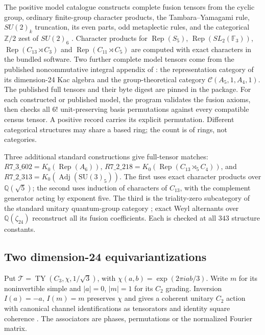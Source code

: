 \documentclass[11pt]{article}
\newcommand{\Z}{\mathbb Z}
\begin{document}
The positive model catalogue constructs complete fusion tensors from
the cyclic group, ordinary finite-group character products, the
Tambara--Yamagami rule, $SU(2)_k$ truncation, its even parts, odd
metaplectic rules, and the categorical $\Z/2$ zest of $SU(2)_6$
\cite{TY,KO,Metaplectic,Zest,Vercleyen}. Character products for
$\operatorname{Rep}(S_5)$, $\operatorname{Rep}(SL_2(\mathbb F_3))$,
$\operatorname{Rep}(C_{13}\rtimes C_3)$ and
$\operatorname{Rep}(C_{11}\rtimes C_5)$ are computed with exact
characters in the bundled software. Two further complete model tensors
come from the published noncommutative integral appendix of
\cite[Theorem~1.6 and Section~6.2]{Integral}: the representation
category of its dimension-24 Kac algebra and the group-theoretical
category $\mathcal C(A_5,1,A_4,1)$. The published full tensors and
their byte digest are pinned in the package. For each constructed or
published model, the program validates the fusion axioms, then checks
all $6!$ unit-preserving basis permutations against every compatible
census tensor. A positive record carries its explicit permutation.
Different categorical structures may share a based ring; the count
is of rings, not categories.

Three additional standard constructions give full-tensor matches:
$R7\_3\_602=K_0(\operatorname{Rep}(A_6))$,
$R7\_2\_218=K_0(\operatorname{Rep}(C_{13}\rtimes_5 C_4))$, and
$R7\_2\_313=K_0(\operatorname{Adj}(\mathrm{SU}(3)_5))$.
The first uses exact character products over $\mathbb Q(\sqrt5)$;
the second uses induction of characters of $C_{13}$, with the
complement generator acting by exponent five. The third is the
triality-zero subcategory of the standard unitary quantum-group
category \cite{Wenzl}; exact Weyl alternants over $\mathbb Q(\zeta_{24})$
reconstruct all its fusion coefficients. Each is checked at all
$343$ structure constants.

\subsection{Two dimension-24 equivariantizations}
\label{sec:tyequiv}
Put $\mathcal T=\operatorname{TY}(C_3,\chi,1/\sqrt3)$, with
$\chi(a,b)=\exp(2\pi iab/3)$. Write $m$ for its noninvertible simple and
$|a|=0$, $|m|=1$ for its $C_2$ grading. Inversion $I(a)=-a$, $I(m)=m$
preserves $\chi$ and gives a coherent unitary $C_2$ action with canonical
channel identifications as tensorators and identity square coherence
\cite[Section~4A and Proposition~4.8]{GNN}.
The associators are phases, permutations or the normalized Fourier matrix.
\end{document}
